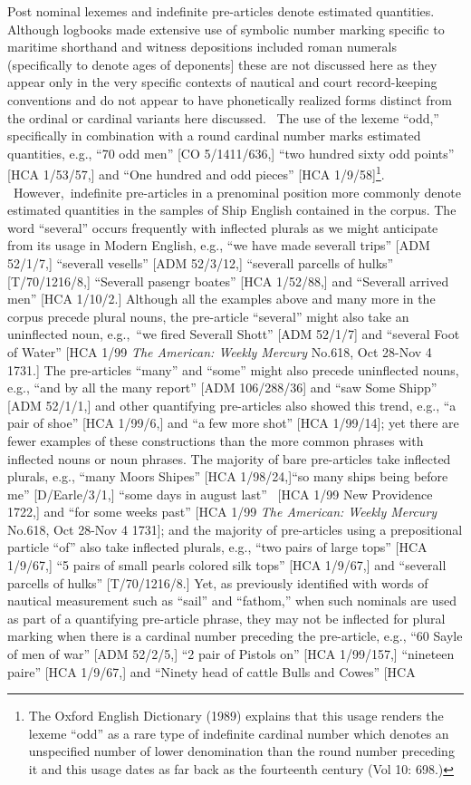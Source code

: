 \documentclass[12pt]{article}
\newenvironment{styleStandard}{\renewcommand\baselinestretch{1.0}\setlength\leftskip{0cm}\setlength\rightskip{0cm plus 1fil}\setlength\parindent{0cm}\setlength\parfillskip{0pt plus 1fil}\setlength\parskip{0in plus 1pt}\writerlistparindent\writerlistleftskip\leavevmode\normalfont\normalsize\writerlistlabel\ignorespaces}{\unskip\vspace{0in plus 1pt}\par}
\newcommand\writerlistleftskip{}
\newcommand\writerlistparindent{}
\newcommand\writerlistlabel{}
\begin{document}
\begin{styleStandard}
Post nominal lexemes and indefinite pre-articles denote estimated quantities. Although logbooks made extensive use of symbolic number marking specific to maritime shorthand and witness depositions included roman numerals (specifically to denote ages of deponents] these are not discussed here as they appear only in the very specific contexts of nautical and court record-keeping conventions and do not appear to have phonetically realized forms distinct from the ordinal or cardinal variants here discussed. \ The use of the lexeme “odd,” specifically in combination with a round cardinal number marks estimated quantities, e.g., “70 odd men” [CO 5/1411/636,] “two hundred sixty odd points” [HCA 1/53/57,] and “One hundred and odd pieces” [HCA 1/9/58]\footnote{ The Oxford English Dictionary (1989) explains that this usage renders the lexeme “odd” as a rare type of indefinite cardinal number which denotes an unspecified number of lower denomination than the round number preceding it and this usage dates as far back as the fourteenth century (Vol 10: 698.)}. \ However,~indefinite pre-articles in a prenominal position more commonly denote estimated quantities in the samples of Ship English contained in the corpus. The word “several” occurs frequently with inflected plurals as we might anticipate from its usage in Modern English, e.g., “we have made severall trips” [ADM 52/1/7,] “severall vesells” [ADM 52/3/12,] “severall parcells of hulks” [T/70/1216/8,] “Severall pasengr boates” [HCA 1/52/88,] and “Severall arrived men” [HCA 1/10/2.] Although all the examples above and many more in the corpus precede plural nouns, the pre-article “several” might also take an uninflected noun, e.g.,~“we fired Severall Shott” [ADM 52/1/7] and “several Foot of Water” [HCA 1/99 \textit{The American: Weekly Mercury} No.618, Oct 28-Nov 4 1731.] The pre-articles “many” and “some” might also precede uninflected nouns, e.g., “and by all the many report” [ADM 106/288/36] and “saw Some Shipp” [ADM 52/1/1,] and other quantifying pre-articles also showed this trend, e.g., “a pair of shoe” [HCA 1/99/6,] and “a few more shot” [HCA 1/99/14]; yet there are fewer examples of these constructions than the more common phrases with inflected nouns or noun phrases. The majority of bare pre-articles take inflected plurals, e.g., “many Moors Shipes” [HCA 1/98/24,]“so many ships being before me” [D/Earle/3/1,] “some days in august last” ~[HCA 1/99 New Providence 1722,] and “for some weeks past” [HCA 1/99 \textit{The American: Weekly Mercury} No.618, Oct 28-Nov 4 1731]; and the majority of pre-articles using a prepositional particle “of” also take inflected plurals, e.g., “two pairs of large tops” [HCA 1/9/67,] “5 pairs of small pearls colored silk tops” [HCA 1/9/67,] and “severall parcells of hulks” [T/70/1216/8.] Yet, as previously identified with words of nautical measurement such as “sail” and “fathom,” when such nominals are used as part of a quantifying pre-article phrase, they may not be inflected for plural marking when there is a cardinal number preceding the pre-article, e.g., “60 Sayle of men of war” [ADM 52/2/5,] “2 pair of Pistols on” [HCA 1/99/157,] “nineteen paire” [HCA 1/9/67,] and “Ninety head of cattle Bulls and Cowes” [HCA 
\end{styleStandard}
\end{document}
